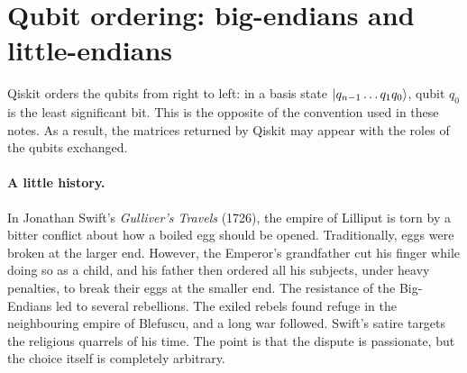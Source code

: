 \section{Qubit ordering: big-endians and little-endians}\label{sec:endian}
Qiskit orders the qubits from right to left: in a basis state $\left|q_{n-1}\dots q_1q_0\right\rangle$, qubit $q_0$ is the least significant bit. This is the opposite of the convention used in these notes.
As a result, the matrices returned by Qiskit may appear with the roles of the qubits exchanged.

\paragraph{A little history.} In Jonathan Swift's \emph{Gulliver's Travels} (1726), the empire of Lilliput is torn by a bitter conflict about how a boiled egg should be opened. Traditionally, eggs
were broken at the larger end. However, the Emperor's grandfather cut his finger while doing so as a child, and his father then ordered all his subjects, under heavy penalties, to break their eggs
at the smaller end. The resistance of the Big-Endians led to several rebellions. The exiled rebels found refuge in the neighbouring empire of Blefuscu, and a long war followed. Swift's satire
targets the religious quarrels of his time. The point is that the dispute is passionate, but the choice itself is completely arbitrary.


